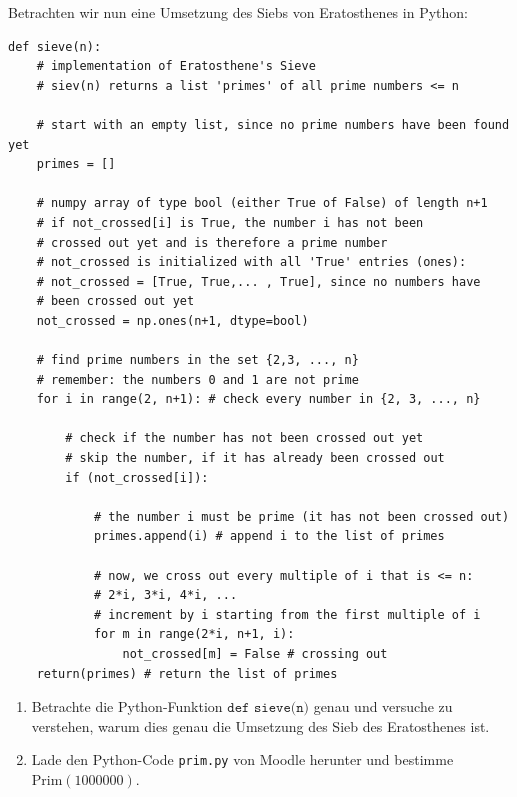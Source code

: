 Betrachten wir nun eine Umsetzung des Siebs von Eratosthenes in Python:
\begin{listing}[H]
\begin{verbatim}
def sieve(n):
    # implementation of Eratosthene's Sieve
    # siev(n) returns a list 'primes' of all prime numbers <= n

    # start with an empty list, since no prime numbers have been found yet
    primes = []

    # numpy array of type bool (either True of False) of length n+1
    # if not_crossed[i] is True, the number i has not been
    # crossed out yet and is therefore a prime number
    # not_crossed is initialized with all 'True' entries (ones):
    # not_crossed = [True, True,... , True], since no numbers have
    # been crossed out yet
    not_crossed = np.ones(n+1, dtype=bool)

    # find prime numbers in the set {2,3, ..., n}
    # remember: the numbers 0 and 1 are not prime
    for i in range(2, n+1): # check every number in {2, 3, ..., n}

        # check if the number has not been crossed out yet
        # skip the number, if it has already been crossed out
        if (not_crossed[i]):

            # the number i must be prime (it has not been crossed out)
            primes.append(i) # append i to the list of primes

            # now, we cross out every multiple of i that is <= n:
            # 2*i, 3*i, 4*i, ...
            # increment by i starting from the first multiple of i
            for m in range(2*i, n+1, i):
                not_crossed[m] = False # crossing out
    return(primes) # return the list of primes
\end{verbatim}
\label{listing:sieve}
\end{listing}
\clearpage

\begin{Exercise}
\begin{enumerate}[label=(\alph*)]
\item Betrachte die Python-Funktion $\texttt{def sieve(n)}$ genau und versuche zu verstehen, warum dies genau die Umsetzung des Sieb des Eratosthenes ist.
\item Lade den Python-Code {\tt prim.py} von Moodle herunter und bestimme $\text{Prim}(1000000)$.
\end{enumerate}
\end{Exercise}

